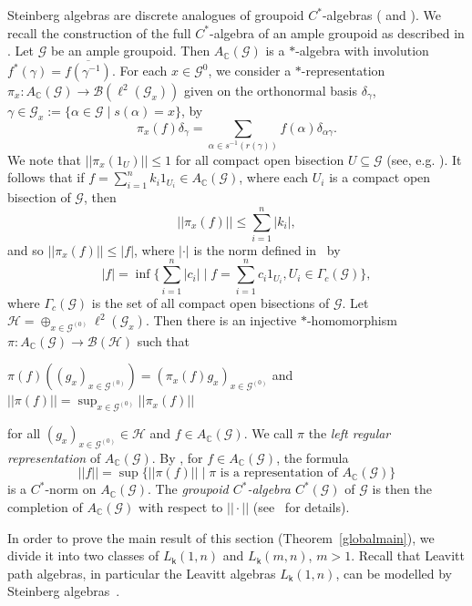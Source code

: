 \documentclass[a4paper, 11pt, reqno]{amsart}
\theoremstyle{definition}
\newcommand{\K}{\mathsf{k}}
\begin{document}
Steinberg algebras are discrete analogues of groupoid $C^*$-algebras (\cite{p:gisatoa} and \cite{renault}). We recall the construction of the full $C^*$-algebra of an ample groupoid as described in \cite{ClarkZim24}. Let $\mathcal{G}$ be an ample groupoid. Then $A_{\mathbb{C}}(\mathcal{G})$ is a $*$-algebra with involution $f^*(\gamma) = \overline{f(\gamma^{-1})}$. For each $x\in \mathcal{G}^{0}$, we consider a $*$-representation $\pi_x: A_{\mathbb{C}}(\mathcal{G}) \longrightarrow \mathcal{B}(\ell^2(\mathcal{G}_x))$ given on the
orthonormal basis $\delta_{\gamma}$, $\gamma \in \mathcal{G}_x:= \{\alpha \in \mathcal{G}\mid s(\alpha) = x\}$, by $$\pi_x(f)\delta_{\gamma} = \sum_{\alpha \in s^{-1}(r(\gamma))}f(\alpha)\delta_{\alpha\gamma}.$$
We note that $||\pi_x(1_U)||\le 1$ for all compact open bisection $U \subseteq \mathcal{G}$ (see, e.g. \cite[page 10]{steinwyk}). It follows that if $f = \sum^n_{i=1}k_i1_{U_i}\in A_{\mathbb{C}}(\mathcal{G})$, where each $U_i$ is a compact open bisection of $\mathcal{G}$, then $$||\pi_x(f)|| \le \sum^n_{i=1}|k_i|,$$ and so $||\pi_x(f)|| \le |f|$, where $| \cdot |$ is the norm defined in~\cite{steinwyk} by
$$|f| = \inf\Big\{\sum^n_{i=1}|c_i| \mid f =\sum^n_{i=1}c_i1_{U_i}, U_i \in \Gamma_c(\mathcal{G})\Big\},$$ 
where $\Gamma_c(\mathcal{G})$ is the set of all  compact
open bisections of $\mathcal{G}$. Let $\mathcal{H} = \oplus_{x\in \mathcal{G}^{(0)}} \ell^2(\mathcal{G}_x)$. Then there  is an injective $*$-homomorphism $\pi: A_{\mathbb{C}}(\mathcal{G}) \longrightarrow \mathcal{B}(\mathcal{H})$ such that 
\begin{center}
$\pi(f)((g_x)_{x\in \mathcal{G}^{(0)}}) = (\pi_x(f)g_x)_{x\in \mathcal{G}^{(0)}}$	and $||\pi(f)|| = \sup_{x\in \mathcal{G}^{(0)}}||\pi_x(f)||$ 
\end{center}
for all $(g_x)_{x\in \mathcal{G}^{(0)}}\in \mathcal{H}$ and $f\in A_{\mathbb{C}}(\mathcal{G})$. We call $\pi$ the {\it left regular representation} of $A_{\mathbb{C}}(\mathcal{G})$. By \cite[Theorem 4.7]{ClarkZim24}, for $f\in A_{\mathbb{C}}(\mathcal{G})$, the formula $$||f|| = \sup \{||\pi(f)|| \mid \pi \text{ is a representation of } A_{\mathbb{C}}(\mathcal{G})\}$$ is a $C^*$-norm on 
$A_{\mathbb{C}}(\mathcal{G})$.
The {\it groupoid $C^*$-algebra $C^*(\mathcal{G})$} of $\mathcal{G}$ is
 then the completion of $A_{\mathbb{C}}(\mathcal{G})$ with respect to $||\cdot||$ (see~\cite{ClarkZim24} for details).


In order to prove the main result of this section (Theorem~\ref{globalmain}), we divide it into two classes of $L_\K(1,n)$ and  $L_\K(m,n)$, $m>1$.  Recall that Leavitt path algebras, in particular the Leavitt algebras $L_\K(1,n)$, can be modelled by Steinberg algebras~\cite{lisarooz}. 
\end{document}
